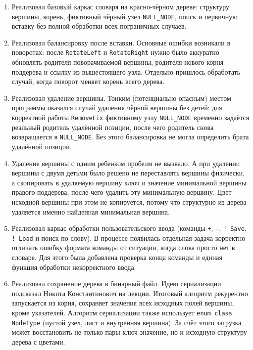 \documentclass[12pt]{article}
\begin{document}
\begin{enumerate}
\item Реализовал базовый каркас словаря на красно-чёрном дереве: структуру вершины, корень, фиктивный чёрный узел \texttt{NULL\_NODE}, поиск и первичную вставку без полной обработки всех пограничных случаев.

\item Реализовал балансировку после вставки. Основные ошибки возникали в поворотах: после \texttt{RotateLeft} и \texttt{RotateRight} нужно было аккуратно обновлять родителя поворачиваемой вершины, родителя нового корня поддерева и ссылку из вышестоящего узла. Отдельно пришлось обработать случай, когда поворот меняет корень всего дерева.

\item Реализовал удаление вершины. Тонким (потенциально опасным) местом программы оказался случай удаления чёрной вершины без детей: для корректной работы \texttt{RemoveFix} фиктивному узлу \texttt{NULL\_NODE} временно задаётся реальный родитель удалённой позиции, после чего родитель снова возвращается в \texttt{NULL\_NODE}. Без этого балансировка не могла определить брата удалённой позиции.

\item Удаление вершины с одним ребенком пробелм не вызвало. А при удалении вершины с двумя детьми было решено не переставлять вершины физически, а скопировать в удаляемую вершину ключ и значение минимальной вершины правого поддерева, после чего удалить эту минимальную вершину. Цвет исходной вершины при этом не копируется, потому что структурно из дерева удаляется именно найденная минимальная вершина.

\item Реализовал каркас обработки пользовательского ввода (команды \texttt{+}, \texttt{-}, \texttt{! Save}, \texttt{! Load} и поиск по слову). В процессе появилась отдельная задача корректно отличать ошибку формата команды от ситуации, когда слова просто нет в словаре. Для этого была добавлена проверка конца команды и единая функция обработки некорректного ввода.

\item Реализовал сохранение дерева в бинарный файл. Идею сериализации подсказал Никита Константинович на лекции. Итоговый алгоритм рекурентно запускается из корня, сохраняет значения всех исходных полей вершины, кроме указателей. Алгоритм сериализации также использует \texttt{enum class NodeType} (пустой узел, лист и внутренняя вершина). За счёт этого загрузка может восстановить не только пары ключ-значение, но и исходную структуру дерева с цветами.


\end{enumerate}
\end{document}
